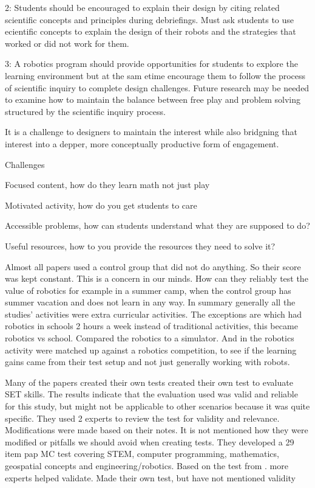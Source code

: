 2: Students should be encouraged to explain their design by citing related scientific concepts and principles during debriefings. Must ask students to use ecientific concepts to explain the design of their robots and the strategies that worked or did not work for them. 

3: A robotics program should provide opportunities for students to explore the learning environment but at the sam etime encourage them to follow the process of scientific inquiry to complete design challenges. Future research may be needed to examine how to maintain the balance between free play and problem solving structured by the scientific inquiry process. 

It is a challenge to designers to maintain the interest while also bridgning that interest into a depper, more conceptually productive form of engagement. 

Challenges

Focused content, how do they learn math not just play

Motivated activity, how do you get students to care

Accessible problems, how can students understand what they are supposed to do?

Useful resources, how to you provide the resources they need to solve it?


Almost all papers used a control group that did not do anything. So their score was kept constant. This is a concern in our minds. How can they reliably test the value of robotics for example in a summer camp, when the control group has summer vacation and does not learn in any way. In summary generally all the studies’ activities were extra curricular activities. The exceptions are \cite{lindh2007does} which had robotics in schools 2 hours a week instead of traditional activities, this became robotics vs school. \cite{mitnik2009collaborative} Compared the robotics to a simulator. And in \cite{silk2011resources} the robotics activity were matched up against a robotics competition, to see if the learning gains came from their test setup and not just generally working with robots.  

\bigskip\noindent
Many of the papers created their own tests
\cite{barker2007robotics} created their own test to evaluate SET skills. The results indicate that the evaluation used was valid and reliable for this study, but might not be applicable to other scenarios because it was quite specific. They used 2 experts to review the test for validity and relevance. Modifications were made based on their notes. It is not mentioned how they were modified or pitfalls we should avoid when creating tests.
\cite{nugent2008effect} They developed a 29 item pap MC test covering STEM, computer programming, mathematics, geospatial concepts and engineering/robotics. Based on the test from \cite{barker2007robotics}. more experts helped validate. 
\cite{williams2007acquisition} Made their own test, but have not mentioned validity

